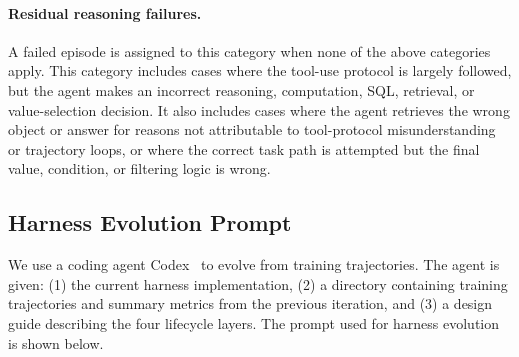 \paragraph{Residual reasoning failures.}
A failed episode is assigned to this category when none of the above categories apply. This category includes cases where the tool-use protocol is largely followed, but the agent makes an incorrect reasoning, computation, SQL, retrieval, or value-selection decision. It also includes cases where the agent retrieves the wrong object or answer for reasons not attributable to tool-protocol misunderstanding or trajectory loops, or where the correct task path is attempted but the final value, condition, or filtering logic is wrong.

\subsection{Harness Evolution Prompt}
\label{app:evolution-prompts}

We use a coding agent Codex~\cite{openai2026codexcli} to evolve \method{} from training trajectories. The agent is
given: (1) the current harness implementation, (2) a directory containing
training trajectories and summary metrics from the previous iteration, and
(3) a design guide describing the four lifecycle layers. The prompt used for harness evolution is shown below.

